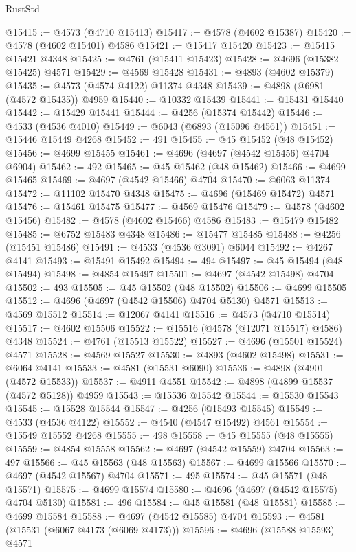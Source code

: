 \begin{lexlean}{RustStd}
\begin{coremodule}
@15415 := @4573 (@4710 @15413)
@15417 := @4578 (@4602 @15387)
@15420 := @4578 (@4602 @15401) @4586
@15421 := @15417 @15420
@15423 := @15415 @15421 @4348
@15425 := @4761 (@15411 @15423)
@15428 := @4696 (@15382 @15425) @4571
@15429 := @4569 @15428
@15431 := @4893 (@4602 @15379)
@15435 := @4573 (@4574 @4122) @11374 @4348
@15439 := @4898 (@6981 (@4572 @15435)) @4959
@15440 := @10332 @15439
@15441 := @15431 @15440
@15442 := @15429 @15441
@15444 := @4256 (@15374 @15442)
@15446 := @4533 (@4536 @4010)
@15449 := @6043 (@6893 (@15096 @4561))
@15451 := @15446 @15449 @4268
@15452 := 491
@15455 := @45 @15452 (@48 @15452)
@15456 := @4699 @15455
@15461 := @4696 (@4697 (@4542 @15456) @4704 @6904)
@15462 := 492
@15465 := @45 @15462 (@48 @15462)
@15466 := @4699 @15465
@15469 := @4697 (@4542 @15466) @4704
@15470 := @6063 @11374
@15472 := @11102 @15470 @4348
@15475 := @4696 (@15469 @15472) @4571
@15476 := @15461 @15475
@15477 := @4569 @15476
@15479 := @4578 (@4602 @15456)
@15482 := @4578 (@4602 @15466) @4586
@15483 := @15479 @15482
@15485 := @6752 @15483 @4348
@15486 := @15477 @15485
@15488 := @4256 (@15451 @15486)
@15491 := @4533 (@4536 @3091) @6044
@15492 := @4267 @4141
@15493 := @15491 @15492
@15494 := 494
@15497 := @45 @15494 (@48 @15494)
@15498 := @4854 @15497
@15501 := @4697 (@4542 @15498) @4704
@15502 := 493
@15505 := @45 @15502 (@48 @15502)
@15506 := @4699 @15505
@15512 := @4696 (@4697 (@4542 @15506) @4704 @5130) @4571
@15513 := @4569 @15512
@15514 := @12067 @4141
@15516 := @4573 (@4710 @15514)
@15517 := @4602 @15506
@15522 := @15516 (@4578 (@12071 @15517) @4586) @4348
@15524 := @4761 (@15513 @15522)
@15527 := @4696 (@15501 @15524) @4571
@15528 := @4569 @15527
@15530 := @4893 (@4602 @15498)
@15531 := @6064 @4141
@15533 := @4581 (@15531 @6090)
@15536 := @4898 (@4901 (@4572 @15533))
@15537 := @4911 @4551
@15542 := @4898 (@4899 @15537 (@4572 @5128)) @4959
@15543 := @15536 @15542
@15544 := @15530 @15543
@15545 := @15528 @15544
@15547 := @4256 (@15493 @15545)
@15549 := @4533 (@4536 @4122)
@15552 := @4540 (@4547 @15492) @4561
@15554 := @15549 @15552 @4268
@15555 := 498
@15558 := @45 @15555 (@48 @15555)
@15559 := @4854 @15558
@15562 := @4697 (@4542 @15559) @4704
@15563 := 497
@15566 := @45 @15563 (@48 @15563)
@15567 := @4699 @15566
@15570 := @4697 (@4542 @15567) @4704
@15571 := 495
@15574 := @45 @15571 (@48 @15571)
@15575 := @4699 @15574
@15580 := @4696 (@4697 (@4542 @15575) @4704 @5130)
@15581 := 496
@15584 := @45 @15581 (@48 @15581)
@15585 := @4699 @15584
@15588 := @4697 (@4542 @15585) @4704
@15593 := @4581 (@15531 (@6067 @4173 (@6069 @4173)))
@15596 := @4696 (@15588 @15593) @4571

\end{coremodule}
\end{lexlean}
